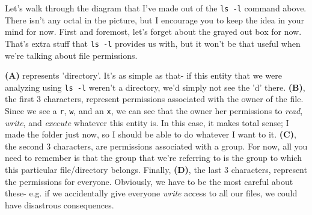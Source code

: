\documentclass[english, 10pt]{article}
\begin{document}
{
}

Let's walk through the diagram that I've made out of the \texttt{ls -l} command above. There isn't any octal in the picture, but I encourage you to keep the idea in your mind for now. First and foremost, let's forget about the grayed out box for now. That's extra stuff that \texttt{ls -l} provides us with, but it won't be that useful when we're talking about file permissions.\newline

\textbf{(A)} represents 'directory'. It's as simple as that- if this entity that we were analyzing using \texttt{ls -l} weren't a directory, we'd simply not see the 'd' there. \textbf{(B)}, the first 3 characters, represent permissions associated with the owner of the file. Since we see a \texttt{r}, \texttt{w}, and an \texttt{x}, we can see that the owner her permissions to \textit{read}, \textit{write}, and \textit{execute} whatever this entity is. In this case, it makes total sense; I made the folder just now, so I should be able to do whatever I want to it. \textbf{(C)}, the second 3 characters, are permissions associated with a group. For now, all you need to remember is that the group that we're referring to is the group to which this particular file/directory belongs. Finally, \textbf{(D)}, the last 3 characters, represent the permissions for everyone. Obviously, we have to be the most careful about these- e.g. if we accidentally give everyone \textit{write} access to all our files, we could have disastrous consequences.\newline
\end{document}
